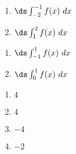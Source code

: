 {\noindent
\begin{minipage}{\linewidth}
\end{minipage}
\noindent\begin{minipage}[t]{.5\linewidth}
\begin{enumerate}
\item		$\ds \int_{-2}^{-1} f(x)\ dx$
\item		$\ds \int_1^2 f(x)\ dx$
\end{enumerate}
\end{minipage}
\begin{minipage}[t]{.5\linewidth}
\begin{enumerate}\addtocounter{enumii}{2}
\item		$\ds \int_{-1}^1 f(x)\ dx$
\item		$\ds \int_0^1 f(x)\ dx$
\end{enumerate}
\end{minipage}
}
{\begin{enumerate}
\item		$4$
\item		$4$
\item		$-4$
\item		$-2$
\end{enumerate}
}

